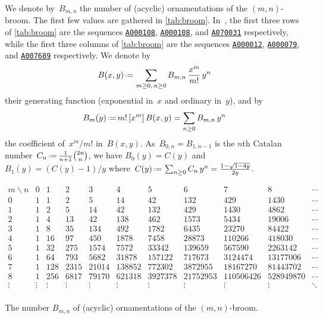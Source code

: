\documentclass{amsart}
\theoremstyle{definition}
\newcommand{\eqdef}{\mbox{\,\raisebox{0.2ex}{\scriptsize\ensuremath{\mathrm:}}\ensuremath{=}\,}} %
\newcommand{\OEIS}[1]{{\rm \href{http://oeis.org/#1}{\texttt{#1}}}}
\begin{document}
We denote by~$B_{m,n}$ the number of (acyclic) ornamentations of the $(m,n)$-broom.
The first few values are gathered in \cref{tab:broom}.
In~\cite{OEIS}, the first three rows of \cref{tab:broom} are the sequences \OEIS{A000108}, \OEIS{A000108}, and \OEIS{A070031} respectively, while the first three columns of \cref{tab:broom} are the sequences \OEIS{A000012}, \OEIS{A000079}, and \OEIS{A007689} respectively.
We denote by
\[
B(x,y) \eqdef \sum_{m \ge 0, \, n \ge 0} B_{m,n} \, \frac{x^m}{m!} \, y^n
\]
their generating function (exponential in~$x$ and ordinary in~$y$), and by
\[
B_m(y) \eqdef m! \, [x^m] \, B(x,y) = \sum_{n \ge 0} B_{m,n} \, y^n
\]
the coefficient of~$x^m/m!$ in~$B(x,y)$.
As~$B_{0,n} = B_{1,n-1}$ is the $n$th Catalan number~$C_n \eqdef \frac{1}{n+1}\binom{2n}{n}$, we have $B_0(y) = C(y)$ and~$B_1(y) = (C(y) - 1)/y$ where~$C(y) \eqdef \sum_{n \ge 0} C_n \, y^n = \frac{1-\sqrt{1-4y}}{2y}$.

\begin{table}
	\[
	\begin{array}{c|ccccccccccc}
	m \backslash n & 0 & 1 & 2 & 3 & 4 & 5 & 6 & 7 & 8 & \cdots \\
	\hline
	0 & 1 & 1 & 2 & 5 & 14 & 42 & 132 & 429 & 1430 & \cdots \\ %
	1 & 1 & 2 & 5 & 14 & 42 & 132 & 429 & 1430 & 4862 & \cdots \\ %
	2 & 1 & 4 & 13 & 42 & 138 & 462 & 1573 & 5434 & 19006 & \cdots \\ %
	3 & 1 & 8 & 35 & 134 & 492 & 1782 & 6435 & 23270 & 84422 & \cdots \\ %
	4 & 1 & 16 & 97 & 450 & 1878 & 7458 & 28873 & 110266 & 418030 & \cdots \\
	5 & 1 & 32 & 275 & 1574 & 7572 & 33342 & 139659 & 567590 & 2263142 & \cdots \\
	6 & 1 & 64 & 793 & 5682 & 31878 & 157122 & 717673 & 3124474 & 13177006 & \cdots \\
	7 & 1 & 128 & 2315 & 21014 & 138852 & 772302 & 3872955 & 18167270 & 81443702 & \cdots \\
	8 & 1 & 256 & 6817 & 79170 & 621318 & 3927378 & 21752953 & 110506426 & 528949870 & \cdots \\ 
	\vdots & \vdots & \vdots & \vdots & \vdots & \vdots & \vdots & \vdots & \vdots & \vdots & \ddots \\
	\end{array}
	\]
	\caption{The number $B_{m,n}$ of (acyclic) ornamentations of the $(m,n)$-broom.}
	\label{tab:broom}
\end{table}
\end{document}

